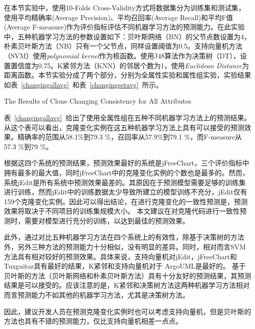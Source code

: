 在本节实验中，使用10-Folds Cross-Validity方式将数据集分为训练集和测试集，使用平均精确率(Average Precision)、平均召回率(Average Recall)和平均F值(Average F-measure)作为评价指标评估不同机器学习方法的预测能力。在此实验中，五种机器学习方法的参数设置如下：贝叶斯网络（BN）的父节点数设置为4， 朴素贝叶斯方法（NB）只有一个父节点，同样设置阈值为0.5。支持向量机方法（SVM）使用{\em polynomial kernel\/}作为核函数。使用J48算法作为决策树（DT），设置置信度为0.75。K紧邻方法（KNN）的邻居个数为1，使用{\em Euclidean Distance\/}为距离函数。本节实验分成了两个部分，分别为全属性实验和属性组实验，实验结果如表~\ref{changingallavg}~和表~\ref{changingsetavg}~所示。

{The Results of Clone Changing Consistency for All Attributes}

表~\ref{changingallavg}~给出了使用全属性组在五种不同机器学习方法上的预测结果。从这个表可以看出，克隆变化实例在这五种机器学习方法上具有可以接受的预测效果。精确率的范围从58.1\%到79.3 \%，召回率从57.9\%到79.1 \%，而F-measure从57.3 \%到79 \%。

根据这四个系统的预测结果，预测效果最好的系统是jFreeChart，三个评价指标中拥有最多的最大值，同时jFreeChart中的克隆变化实例的个数也是最多的。然而，系统jEdit是所有系统中预测效果最差的。其原因在于预测模型需要足够的训练集进行训练，然而jEdit中的训练数据太少导致所建立的模型训练不充分，jEdit仅有159个克隆变化实例。因此可以得出结论，在进行克隆变化的一致性预测是，预测效果将取决于不同项目的训练集规模大小。
本文建议在对克隆代码进行一致性预测时，需要对模型进行充分的训练，以达到最佳的预测效果。

此外，通过对比五种机器学习方法在四个系统上的有效性，除基于决策树的方法外，另外三种方法的预测能力十分相似，没有明显的差异。同时，相对而言SVM方法具有相对较好的预测效果。具体来说，支持向量机对jEdit，jFreeChart和Tuxguitar具有最好的结果，K紧邻和支持向量机对于 ArgoUML是最好的。
基于贝叶斯的方法（贝叶斯网络和朴素贝叶斯方法）具有十分友好的预测结果，其预测结果是可以接受的。应该注意的是，K紧邻和决策树方法这两种机器学习方法相对而言预测能力不如其他的机器学习方法，尤其是决策树方法。

因此，建议开发人员在预测克隆变化实例时也可以考虑支持向量机，但是贝叶斯的方法也具有不错的预测能力，仅比支持向量机相差一点点。

